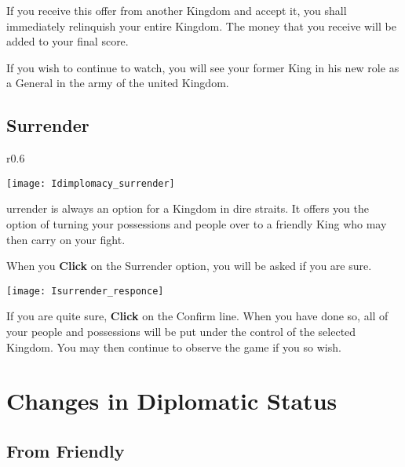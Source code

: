 If you receive this offer from another Kingdom and accept it, you shall immediately relinquish your entire Kingdom. The money that you receive will be added to your final score.

If you wish to continue to watch, you will see your former King in his new role as a General in the army of the united Kingdom.

\subsection{\textsf{Surrender}}


\begin{wrapfigure}{r}{0.6\textwidth}
    \vspace{-20pt}
    \begin{center}
        \texttt{[image: Idimplomacy\_surrender]} %
    \end{center}
    \vspace{-20pt}
\end{wrapfigure}

urrender is always an option for a Kingdom in dire straits. It offers you the option of turning your possessions and people over to a friendly King who may then carry on your fight.

When you \textbf{Click} on the Surrender option, you will be asked if you are sure.

\begin{center}
    \texttt{[image: Isurrender\_responce]} %
\end{center}

If you are quite sure, \textbf{Click} on the Confirm line. When you have done so, all of your people and possessions will be put under the control of the selected Kingdom. You may then continue to observe the game if you so wish.

\section{\textsf{Changes in Diplomatic Status}}


\subsection{\textsf{From Friendly}}

